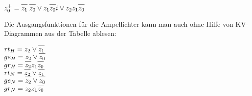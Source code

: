 \documentclass[a4paper,10pt]{scrartcl}
\newcommand*{\oline}[1]{\overline{\vphantom{A}#1}}
\begin{document}
\begin{enumerate}
\begin{enumerate}
\begin{minipage}[t]{0.3\textwidth}

                    $z_0^+ = \oline{z_1}\;\oline{z_0} \vee z_1\oline{z_0}i \vee z_2z_1\oline{z_0}$
                \end{minipage}

                \vspace{1em}

                Die Ausgangsfunktionen für die Ampellichter kann man auch ohne Hilfe
                von KV-Diagrammen aus der Tabelle ablesen:

                $rt_H = z_2 \vee \oline{z_1}$ \\[0.5em]
                $ge_H = z_2 \vee \oline{z_0}$ \\[0.5em]
                $gr_H = \oline{z_2}z_1\oline{z_0}$ \\[0.5em]
                $rt_N = \oline{z_2} \vee \oline{z_1}$ \\[0.5em]
                $ge_N = \oline{z_2} \vee \oline{z_0}$ \\[0.5em]
                $gr_N = z_2z_1\oline{z_0}$\\[0.5em]

        \end{enumerate}
\end{enumerate}
\end{document}
